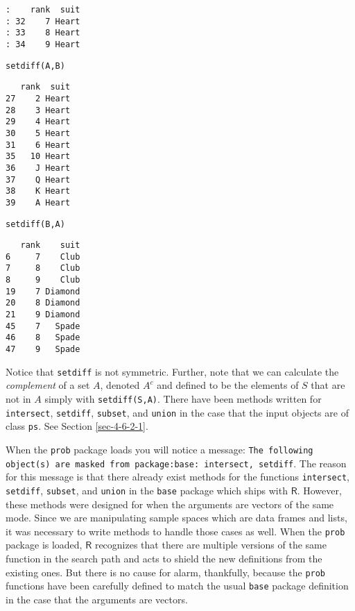 \begin{verbatim}
:    rank  suit
: 32    7 Heart
: 33    8 Heart
: 34    9 Heart
\end{verbatim}

\begin{verbatim}
setdiff(A,B)
\end{verbatim}

\begin{verbatim}
   rank  suit
27    2 Heart
28    3 Heart
29    4 Heart
30    5 Heart
31    6 Heart
35   10 Heart
36    J Heart
37    Q Heart
38    K Heart
39    A Heart
\end{verbatim}

\begin{verbatim}
setdiff(B,A) 
\end{verbatim}

\begin{verbatim}
   rank    suit
6     7    Club
7     8    Club
8     9    Club
19    7 Diamond
20    8 Diamond
21    9 Diamond
45    7   Spade
46    8   Spade
47    9   Spade
\end{verbatim}

Notice that \texttt{setdiff} is not symmetric. Further, note that we can
calculate the \emph{complement} of a set \(A\), denoted \(A^{c}\) and
defined to be the elements of \(S\) that are not in \(A\) simply with
\texttt{setdiff(S,A)}. There have been methods written for \texttt{intersect},
\texttt{setdiff}, \texttt{subset}, and \texttt{union} in the case that the input objects
are of class \texttt{ps}. See Section \ref{sec-4-6-2-1}.

\begin{note}


When the \texttt{prob} package \cite{prob} loads you will notice a message:
\texttt{The following object(s) are masked from package:base: intersect,
setdiff}. The reason for this message is that there already exist
methods for the functions \texttt{intersect}, \texttt{setdiff}, \texttt{subset}, and
\texttt{union} in the \texttt{base} package which ships with
\(\mathsf{R}\). However, these methods were designed for when the
arguments are vectors of the same mode. Since we are manipulating
sample spaces which are data frames and lists, it was necessary to
write methods to handle those cases as well. When the \texttt{prob} package
is loaded, \(\mathsf{R}\) recognizes that there are multiple versions
of the same function in the search path and acts to shield the new
definitions from the existing ones. But there is no cause for alarm,
thankfully, because the \texttt{prob} functions have been carefully defined
to match the usual \texttt{base} package definition in the case that the
arguments are vectors.
\end{note}

